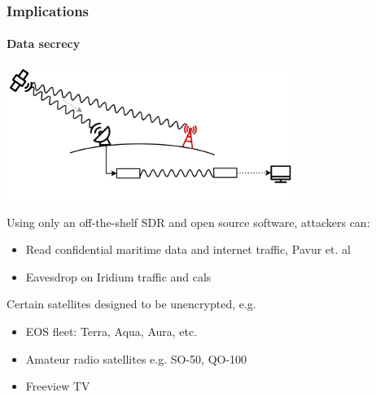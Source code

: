 \documentclass{beamer}
\begin{document}
\begin{frame}
  \frametitle{Implications}
  \framesubtitle{Data secrecy}

  \begin{center}
    \includegraphics[width=0.7\textwidth]{images/eavesdropping_illustration.pdf}
  \end{center}

  Using only an off-the-shelf SDR and open source software, attackers can:
  \begin{itemize}
    \item Read confidential maritime data and internet traffic, Pavur et. al~\cite{pavur2020tale,pavur2019secrets}
    \item Eavesdrop on Iridium traffic and cals~\cite{iridium-toolkit}
  \end{itemize}

  Certain satellites designed to be unencrypted, e.g.
  \begin{itemize}
    \item EOS fleet: Terra, Aqua, Aura, etc.
    \item Amateur radio satellites e.g. SO-50, QO-100
    \item Freeview TV
  \end{itemize}

\end{frame}
\end{document}
